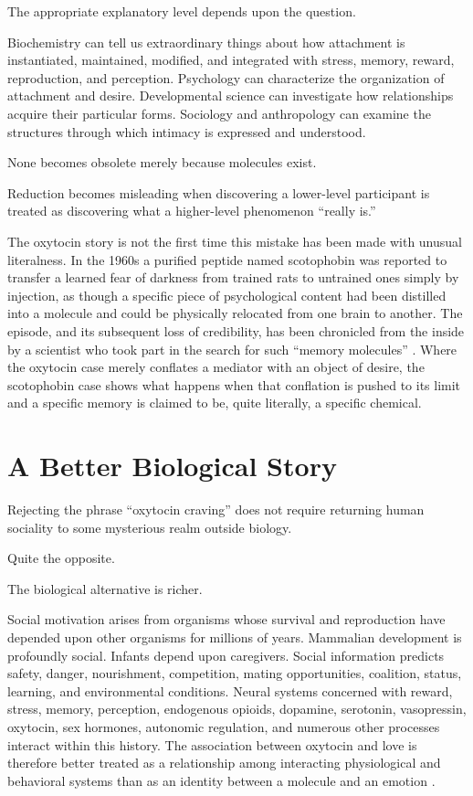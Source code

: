 \documentclass[12pt]{article}
\begin{document}
The appropriate explanatory level depends upon the question.

Biochemistry can tell us extraordinary things about how attachment is instantiated, maintained, modified, and integrated with stress, memory, reward, reproduction, and perception. Psychology can characterize the organization of attachment and desire. Developmental science can investigate how relationships acquire their particular forms. Sociology and anthropology can examine the structures through which intimacy is expressed and understood.

None becomes obsolete merely because molecules exist.

Reduction becomes misleading when discovering a lower-level participant is treated as discovering what a higher-level phenomenon ``really is.''

The oxytocin story is not the first time this mistake has been made with unusual literalness. In the 1960s a purified peptide named scotophobin was reported to transfer a learned fear of darkness from trained rats to untrained ones simply by injection, as though a specific piece of psychological content had been distilled into a molecule and could be physically relocated from one brain to another. The episode, and its subsequent loss of credibility, has been chronicled from the inside by a scientist who took part in the search for such ``memory molecules'' \cite{irwin2006scotophobin}. Where the oxytocin case merely conflates a mediator with an object of desire, the scotophobin case shows what happens when that conflation is pushed to its limit and a specific memory is claimed to be, quite literally, a specific chemical.

\section{A Better Biological Story}

Rejecting the phrase ``oxytocin craving'' does not require returning human sociality to some mysterious realm outside biology.

Quite the opposite.

The biological alternative is richer.

Social motivation arises from organisms whose survival and reproduction have depended upon other organisms for millions of years. Mammalian development is profoundly social. Infants depend upon caregivers. Social information predicts safety, danger, nourishment, competition, mating opportunities, coalition, status, learning, and environmental conditions. Neural systems concerned with reward, stress, memory, perception, endogenous opioids, dopamine, serotonin, vasopressin, oxytocin, sex hormones, autonomic regulation, and numerous other processes interact within this history. The association between oxytocin and love is therefore better treated as a relationship among interacting physiological and behavioral systems than as an identity between a molecule and an emotion \cite{carter2022oxytocin}.
\end{document}
